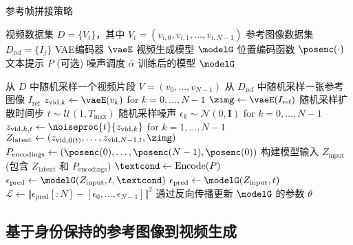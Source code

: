 {\small
\begin{algorithm}[H]
    \setlength{\baselineskip}{0.9\baselineskip}
    \caption{参考帧拼接策略}
    \label{alg:ref_frame_concat}
    \begin{algorithmic}[1]
    \Require
        \Statex 视频数据集 $D = \{V_i\}$，其中 $V_i = (v_{i,0}, v_{i,1}, \dots, v_{i,N-1})$
        \Statex 参考图像数据集 $D_{\text{ref}} = \{I_j\}$
        \Statex VAE编码器 $\vaeE$
        \Statex 视频生成模型 $\modelG$
        \Statex 位置编码函数 $\posenc(\cdot)$
        \Statex 文本提示 $P$ (可选)
        \Statex 噪声调度 $\bar{\alpha}$
    \Ensure 训练后的模型 $\modelG$
    
        \State 从 $D$ 中随机采样一个视频片段 $V = (v_0, \dots, v_{N-1})$
        \State 从 $D_{\text{ref}}$ 中随机采样一张参考图像 $I_{\text{ref}}$
        \State {}
        \State $z_{\text{vid},k} \gets \vaeE(v_k)$ for $k=0, \dots, N-1$
        \State $\zimg \gets \vaeE(I_{\text{ref}})$
        \State 随机采样扩散时间步 $t \sim \mathcal{U}(1, T_{\text{max}})$
        \State 随机采样噪声 $\epsilon_k \sim \mathcal{N}(0, \mathbf{I})$ for $k=0, \dots, N-1$
        \State {}
        \State $z_{\text{vid},k,t} \gets \noiseproc{t}{z_{\text{vid},k}}$ for $k=1, \dots, N-1$
        \State {}
        \State $Z_{\text{latent}} \gets (z_{\text{vid},0(t)}, \dots, z_{\text{vid},N-1,t}, \zimg)$ 
        \State {}
        \State $P_{\text{encodings}} \gets (\posenc(0), \dots, \posenc(N-1), \posenc(0))$
        \State 构建模型输入 $Z_{\text{input}}$ (包含 $Z_{\text{latent}}$ 和 $P_{\text{encodings}}$)
            \State $\textcond \gets \text{Encode}(P)$
            \State $\epsilon_{\text{pred}} \gets \modelG(Z_{\text{input}}, t, \textcond)$
        \Else
            \State $\epsilon_{\text{pred}} \gets \modelG(Z_{\text{input}}, t)$
        \EndIf
        \State {}
        \State $\mathcal{L} \gets \Vert \epsilon_{\text{pred}}[:N] - [\epsilon_0, \dots, \epsilon_{N-1}] \Vert^2$
        \State 通过反向传播更新 $\modelG$ 的参数 $\theta$
    \EndFor
    \end{algorithmic}
\end{algorithm}
}
\subsection{基于身份保持的参考图像到视频生成}\label{sec2}


